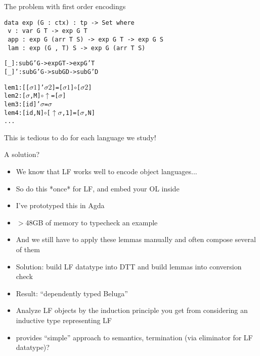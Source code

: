 \documentclass[usenames,dvipsnames]{beamer}
\begin{document}
\begin{frame}[fragile]{The problem with first order encodings}
\begin{verbatim}
data exp (G : ctx) : tp -> Set where
 v : var G T -> exp G T
 app : exp G (arr T S) -> exp G T -> exp G S
 lam : exp (G , T) S -> exp G (arr T S)
\end{verbatim}
\pause
\begin{alltt}
[_] : sub G' G -> exp G T -> exp G' T
[_]' : sub G' G -> sub G D -> sub G' D
\end{alltt}
\pause
\begin{alltt}
lem1 : [ [ \(\sigma1\) ]' \(\sigma2\) ] = [ \(\sigma1\) ] \(\circ\) [ \(\sigma2\) ]
lem2 : [ \(\sigma\) , M ] \(\circ\) \(\uparrow\) = [ \(\sigma\) ]
lem3 : [ id ]' \(\sigma\) = \(\sigma\)
lem4 : [ id , N ] \(\circ\) [ \(\uparrow\) \(\sigma\), 1 ] = [ \(\sigma\) , N ]
...
\end{alltt}
This is tedious to do for each language we study!

\end{frame}

\begin{frame}{A solution?}
\begin{itemize}
\pause \item We know that LF works well to encode object languages...
\pause \item So do this *once* for LF, and embed your OL inside
\pause \item I've prototyped this in Agda
\pause \item $>$48GB of memory to typecheck an example
\pause \item And we still have to apply these lemmas manually and often compose several of them
\pause \item Solution: build LF datatype into DTT and build lemmas into conversion check
\pause \item Result: ``dependently typed Beluga''
\pause \item Analyze LF objects by the induction principle you get from considering an inductive type representing LF
\pause \item provides ``simple'' approach to semantics, termination (via eliminator for LF datatype)?
\end{itemize}
\end{frame}
\end{document}
